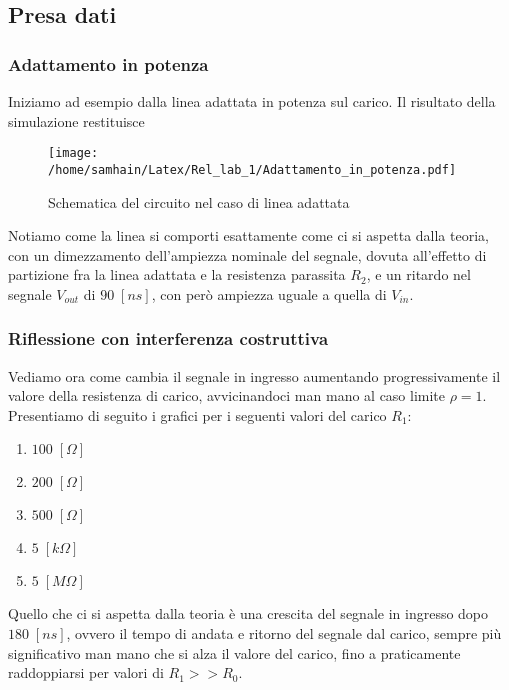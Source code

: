 \documentclass[]{report}
\begin{document}
\newpage

\subsection{Presa dati}

\subsubsection{Adattamento in potenza}

Iniziamo ad esempio dalla linea adattata in potenza sul carico. Il risultato della simulazione restituisce
\begin{figure}[!htb]
	\centering
	\texttt{[image: /home/samhain/Latex/Rel\_lab\_1/Adattamento\_in\_potenza.pdf]}
	\label{ergwg}
	\caption{\label{luegregegl} \small Schematica del circuito nel caso di linea adattata}
\end{figure}

Notiamo come la linea si comporti esattamente come ci si aspetta dalla teoria, con un dimezzamento dell'ampiezza nominale del segnale, dovuta all'effetto di partizione fra la linea adattata e la resistenza parassita $R_2$, e un ritardo nel segnale $V_{out}$ di $90 \; [ns]$, con però ampiezza uguale a quella di $V_{in}$.


\newpage

\subsubsection{Riflessione con interferenza costruttiva}

Vediamo ora come cambia il segnale in ingresso aumentando progressivamente il valore della resistenza di carico, avvicinandoci man mano al caso limite $\rho =1$. Presentiamo di seguito i grafici per i seguenti valori del carico $R_1$: 
\begin{enumerate}
	\item $100 \; [\Omega]$	
	\item $200 \; [\Omega]$	
	\item $500 \; [\Omega]$
	\item $5 \; [k\Omega]$
	\item $5 \; [M\Omega]$
\end{enumerate}

Quello che ci si aspetta dalla teoria è una crescita del segnale in ingresso dopo $180 \; [ns]$, ovvero il tempo di andata e ritorno del segnale dal carico, sempre più significativo man mano che si alza il valore del carico, fino a praticamente raddoppiarsi per valori di $R_1 >> R_0$. 
\end{document}

